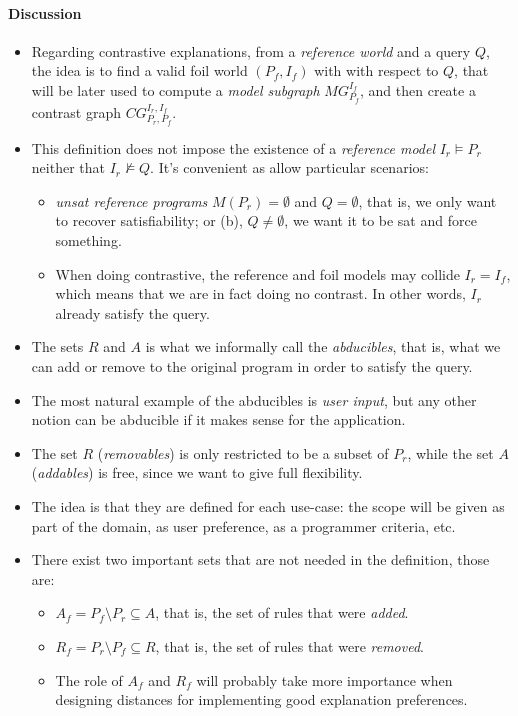 \paragraph{Discussion}
\begin{itemize}
  \item Regarding contrastive explanations, from a \emph{reference world} and a query $Q$, the idea is to find a valid foil world $(P_f, I_f)$ with with respect to $Q$, that will be later used to compute a \emph{model subgraph} $MG_{P_f}^{I_f}$, and then create a contrast graph $CG_{P_r, P_f}^{I_r, I_f}$.
  \item {\color{blue} This definition does not impose the existence of a \emph{reference model} $I_r \models P_r$ neither that $I_r \nvDash Q$.} It's convenient as allow particular scenarios:
  \begin{itemize}
    \item \emph{unsat reference programs} $M(P_r) = \emptyset$ and $Q = \emptyset$, that is, we only want to recover satisfiability; or (b), $Q \neq \emptyset$, we want it to be sat and force something.
    \item When doing contrastive, the reference and foil models may collide $I_r = I_f$, which means that we are in fact doing no contrast. In other words, $I_r$ already satisfy the query.
  \end{itemize}

  \item The sets $R$ and $A$ is what we informally call the \emph{abducibles}, that is, what we can add or remove to the original program in order to satisfy the query.
  \item The most natural example of the abducibles is \emph{user input}, but any other notion can be abducible if it makes sense for the application.
  \item The set $R$ (\emph{removables}) is only restricted to be a subset of $P_r$, while the set $A$ (\emph{addables}) is free, since we want to give full flexibility.
  \item The idea is that they are defined for each use-case: the scope will be given as part of the domain, as user preference, as a programmer criteria, etc.
  \item There exist two important sets that are not needed in the definition, those are:
  \begin{itemize}
    \item $A_f = P_f \setminus P_r \subseteq A$, that is, the set of rules that were \emph{added}.
    \item $R_f = P_r \setminus P_f \subseteq R$, that is, the set of rules that were \emph{removed}.
    \item The role of $A_f$ and $R_f$ will probably take more importance when designing distances for implementing good explanation preferences.
  \end{itemize}
\end{itemize}
%

